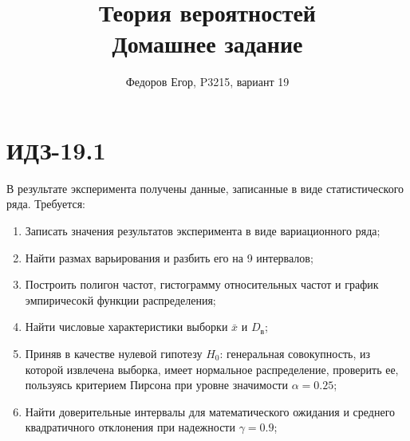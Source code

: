 \documentclass{article}
\title{\textbf{Теория вероятностей} \\ Домашнее задание \textnumero 2}
\author{Федоров Егор, P3215, вариант 19}
\date{}
\theoremstyle{problemstyle}
\begin{document}
\maketitle
\section{ИДЗ-19.1}
В результате эксперимента получены данные, записанные в виде статистического ряда.
Требуется:
\begin{enumerate}
  \item Записать значения результатов эксперимента в виде вариационного ряда;
  \item Найти размах варьирования и разбить его на 9 интервалов;
  \item Построить полигон частот, гистограмму относительных частот и график 
    эмпиричесокй функции распределения;
  \item Найти числовые характеристики выборки \(\bar x\) и \(D_\text{в}\);
  \item Приняв в качестве нулевой гипотезу \(H_0\): генеральная совокупность,
    из которой извлечена выборка, имеет нормальное распределение, проверить ее,
    пользуясь критерием Пирсона при уровне значимости \(\alpha = 0.25\);
  \item Найти доверительные интервалы для математического ожидания и среднего
    квадратичного отклонения при надежности \(\gamma = 0.9\);

\end{enumerate}
\end{document}
